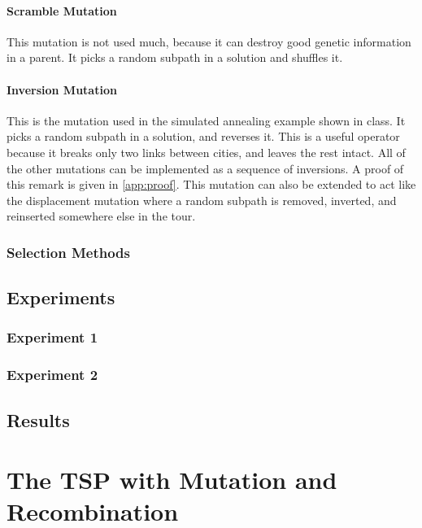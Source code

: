 \documentclass{article}
\begin{document}
\paragraph{Scramble Mutation} This mutation is not used much, because it can destroy good genetic
information in a parent. It picks a random subpath in a solution and shuffles it.
\paragraph{Inversion Mutation} This is the mutation used in the simulated annealing example shown
in class. It picks a random subpath in a solution, and reverses it. This is a useful operator
because it breaks only two links between cities, and leaves the rest intact. All of the other
mutations can be implemented as a sequence of inversions. A proof of this remark is given in
\autoref{app:proof}. This mutation can also be extended to act like the displacement mutation where
a random subpath is removed, inverted, and reinserted somewhere else in the tour.

\subsubsection{Selection Methods}

\subsection{Experiments}
\subsubsection{Experiment 1}
\subsubsection{Experiment 2}

\subsection{Results}

\section{The TSP with Mutation and Recombination}\label{prob:3}
\end{document}
